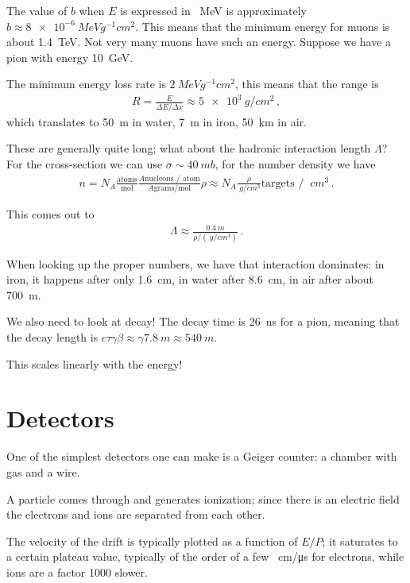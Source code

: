 \documentclass[main.tex]{subfiles}
\begin{document}
The value of \(b\) when \(E\) is expressed in \SI{}{MeV} is approximately \(b \approx \SI{8e-6}{MeV g^{-1} cm^2}\). 
This means that the minimum energy for muons is about \SI{1.4}{TeV}. 
Not very many muons have such an energy. 
Suppose we have a pion with energy \SI{10}{GeV}. 

The  minimum energy loss rate is \(\SI{2}{MeV g^{-1} cm^2}\), this means that the range is 
%
\begin{align}
R = \frac{E}{\Delta E / \Delta x} \approx \SI{5e3}{g / cm^2}
\,,
\end{align}
%
which translates to \SI{50}{m} in water, \SI{7}{m} in iron, \SI{50}{km} in air. 

These are generally quite long; what about the hadronic interaction length \(\Lambda \)? 
For the cross-section we can use \(\sigma \sim \SI{40}{mb}\), for the number density we have 
%
\begin{align}
n = N_A \frac{\text{atoms}}{\text{mol}} \frac{A \text{nucleons / atom}}{A \text{grams}/ \text{mol}} \rho \approx N_A \frac{\rho}{\SI{}{g/cm^3}} \text{targets / } \SI{}{cm^3}
\,.
\end{align}

This comes out to 
%
\begin{align}
\Lambda \approx \frac{\SI{0.4}{m}}{\rho / (\SI{}{g/cm^3})}
\,.
\end{align}

When looking up the proper numbers, we have that interaction dominates: in iron, it happens after only \SI{1.6}{cm}, in water after \SI{8.6}{cm}, in air after about \SI{700}{m}. 

We also need to look at decay! The decay time is \SI{26}{ns} for a pion, meaning that the decay length is \(c \tau \gamma \beta \approx \gamma \SI{7.8}{m} \approx \SI{540}{m}\). 

This scales linearly with the energy! 

\section{Detectors}

One of the simplest detectors one can make is a Geiger counter:
a chamber with gas and a wire. 

A particle comes through and generates ionization; 
since there is an electric field the electrons and ions are separated from each other. 

The velocity of the drift is typically plotted as a function of \(E / P\); it saturates to a certain plateau value, typically of the order of a few \SI{}{cm/\micro s} for electrons, while ions are a factor 1000 slower. 
\end{document}

